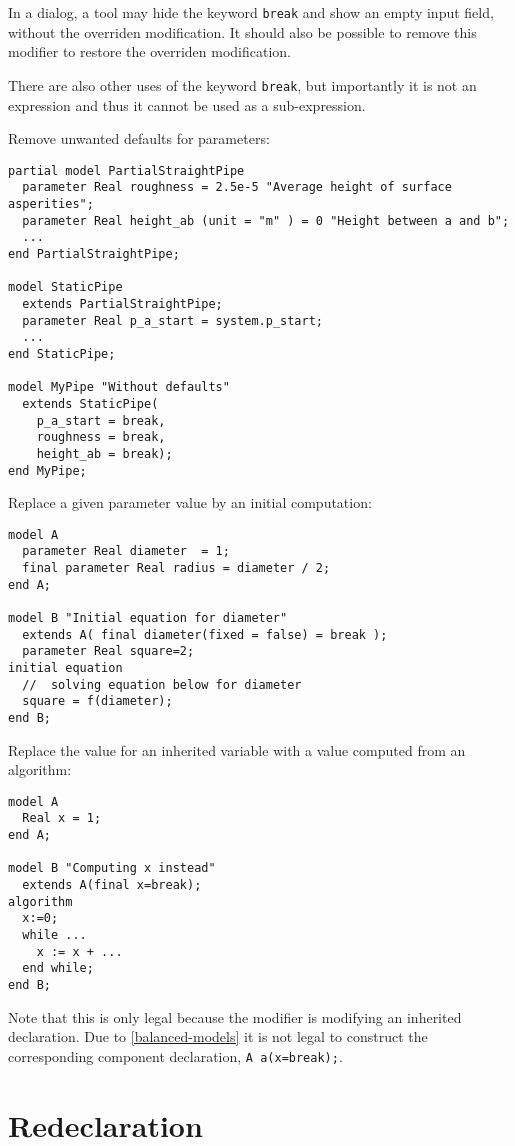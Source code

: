 \begin{nonnormative}
In a dialog, a tool may hide the keyword \lstinline!break! and show an empty input field, without the overriden modification.
It should also be possible to remove this modifier to restore the overriden modification.

There are also other uses of the keyword \lstinline!break!, but importantly it is not an expression and thus it cannot be used as a sub-expression.
\end{nonnormative}

\begin{example}
Remove unwanted defaults for parameters:
\begin{lstlisting}
partial model PartialStraightPipe
  parameter Real roughness = 2.5e-5 "Average height of surface asperities";
  parameter Real height_ab (unit = "m" ) = 0 "Height between a and b";
  ...
end PartialStraightPipe;

model StaticPipe
  extends PartialStraightPipe;
  parameter Real p_a_start = system.p_start;
  ...
end StaticPipe;

model MyPipe "Without defaults"
  extends StaticPipe(
    p_a_start = break,
    roughness = break,
    height_ab = break);
end MyPipe;
\end{lstlisting}
Replace a given parameter value by an initial computation:
\begin{lstlisting}
model A
  parameter Real diameter  = 1;
  final parameter Real radius = diameter / 2;
end A;

model B "Initial equation for diameter"
  extends A( final diameter(fixed = false) = break );
  parameter Real square=2;
initial equation
  //  solving equation below for diameter
  square = f(diameter);
end B;
\end{lstlisting}
Replace the value for an inherited variable with a value computed from an algorithm:
\begin{lstlisting}
model A
  Real x = 1;
end A;

model B "Computing x instead"
  extends A(final x=break);
algorithm
  x:=0;
  while ...
    x := x + ...
  end while;
end B;
\end{lstlisting}
Note that this is only legal because the modifier is modifying an inherited declaration.
Due to \cref{balanced-models} it is not legal to construct the corresponding component declaration, \lstinline!A a(x=break);!.
\end{example}

\section{Redeclaration}\label{redeclaration}

